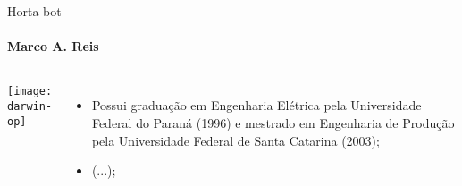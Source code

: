 \begin{frame}[t]{Horta-bot}
    \transboxout[duration=0.5]
    \framesubtitle{Marco A. Reis}
    \begin{columns}
            \texttt{[image: darwin-op]}
            \begin{itemize}
                \justifying
                \item Possui graduação em Engenharia Elétrica pela Universidade Federal do Paraná (1996) e mestrado em Engenharia de Produção pela Universidade Federal de Santa Catarina (2003);
                \item (...);
            \end{itemize}
    \end{columns}
\end{frame}

